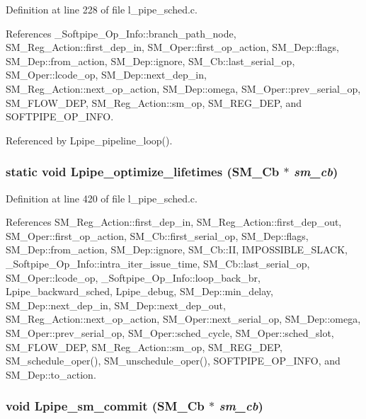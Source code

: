 Definition at line 228 of file l\_\-pipe\_\-sched.c.

References \_\-Softpipe\_\-Op\_\-Info::branch\_\-path\_\-node, SM\_\-Reg\_\-Action::first\_\-dep\_\-in, SM\_\-Oper::first\_\-op\_\-action, SM\_\-Dep::flags, SM\_\-Dep::from\_\-action, SM\_\-Dep::ignore, SM\_\-Cb::last\_\-serial\_\-op, SM\_\-Oper::lcode\_\-op, SM\_\-Dep::next\_\-dep\_\-in, SM\_\-Reg\_\-Action::next\_\-op\_\-action, SM\_\-Dep::omega, SM\_\-Oper::prev\_\-serial\_\-op, SM\_\-FLOW\_\-DEP, SM\_\-Reg\_\-Action::sm\_\-op, SM\_\-REG\_\-DEP, and SOFTPIPE\_\-OP\_\-INFO.

Referenced by Lpipe\_\-pipeline\_\-loop().
\subsubsection{\setlength{\rightskip}{0pt plus 5cm}static void Lpipe\_\-optimize\_\-lifetimes (\bf{SM\_\-Cb} $\ast$ {\em sm\_\-cb})\hspace{0.3cm}{\tt  [static]}}\label{l__pipe__sched_8c_6ea245db13fd3e44deea65c66ab25a8c}




Definition at line 420 of file l\_\-pipe\_\-sched.c.

References SM\_\-Reg\_\-Action::first\_\-dep\_\-in, SM\_\-Reg\_\-Action::first\_\-dep\_\-out, SM\_\-Oper::first\_\-op\_\-action, SM\_\-Cb::first\_\-serial\_\-op, SM\_\-Dep::flags, SM\_\-Dep::from\_\-action, SM\_\-Dep::ignore, SM\_\-Cb::II, IMPOSSIBLE\_\-SLACK, \_\-Softpipe\_\-Op\_\-Info::intra\_\-iter\_\-issue\_\-time, SM\_\-Cb::last\_\-serial\_\-op, SM\_\-Oper::lcode\_\-op, \_\-Softpipe\_\-Op\_\-Info::loop\_\-back\_\-br, Lpipe\_\-backward\_\-sched, Lpipe\_\-debug, SM\_\-Dep::min\_\-delay, SM\_\-Dep::next\_\-dep\_\-in, SM\_\-Dep::next\_\-dep\_\-out, SM\_\-Reg\_\-Action::next\_\-op\_\-action, SM\_\-Oper::next\_\-serial\_\-op, SM\_\-Dep::omega, SM\_\-Oper::prev\_\-serial\_\-op, SM\_\-Oper::sched\_\-cycle, SM\_\-Oper::sched\_\-slot, SM\_\-FLOW\_\-DEP, SM\_\-Reg\_\-Action::sm\_\-op, SM\_\-REG\_\-DEP, SM\_\-schedule\_\-oper(), SM\_\-unschedule\_\-oper(), SOFTPIPE\_\-OP\_\-INFO, and SM\_\-Dep::to\_\-action.
\subsubsection{\setlength{\rightskip}{0pt plus 5cm}void Lpipe\_\-sm\_\-commit (\bf{SM\_\-Cb} $\ast$ {\em sm\_\-cb})}\label{l__pipe__sched_8c_9d49fd9203ffb941ebcc7e0d5dca5140}




